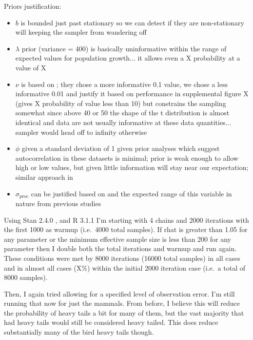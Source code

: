 \documentclass[10pt]{article}
\begin{document}
Priors justification:

\begin{itemize}
\item $b$ is bounded just past stationary so we can detect if they are non-stationary will keeping the sampler from wandering off

\item $\lambda$ prior (variance = 400) is basically uninformative within the range of expected values for population growth... it allows even a X probability at a value of X

\item $\nu$ is based on \citet{fernandez1998}; they chose a more informative 0.1 value, we chose a less informative 0.01 and justify it based on performance in supplemental figure X (gives X probability of value less than 10) but constrains the sampling somewhat since above 40 or 50 the shape of the t distribution is almost identical and data are not usually informative at these data quantities... sampler would head off to infinity otherwise

\item $\phi$ given a standard deviation of 1 given prior analyses which suggest autocorrelation in these datasets is minimal; prior is weak enough to allow high or low values, but given little information will stay near our expectation; similar approach in \citep{thorson2014a}

\item $\sigma_\mathrm{proc}$ can be justified based on \citet{gelman2006c} and the expected range of this variable in nature from previous studies \citep[e.g.][]{connors2014}
\end{itemize}

Using Stan 2.4.0 \citep{stan-manual2014}, and R 3.1.1 \citep{r2014} I'm starting with 4 chains and 2000  iterations with the first 1000 as warmup (i.e.\ 4000 total samples). If rhat is greater than 1.05 for any parameter or the minimum effective sample size is less than 200 for any parameter then I double both the total iterations and warmup and run again. These conditions were met by 8000 iterations (16000 total samples) in all cases and in almost all cases (X\%) within the initial 2000 iteration case (i.e.\ a total of 8000 samples).

Then, I again tried allowing for a specified level of observation error. I'm still running that now for just the mammals. From before, I believe this will reduce the probability of heavy tails a bit for many of them, but the vast majority that had heavy tails would still be considered heavy tailed. This does reduce substantially many of the bird heavy tails though.
\end{document}
